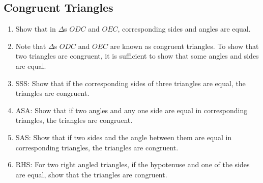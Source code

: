 \subsection{Congruent Triangles}
%
\renewcommand{\theequation}{\theenumi}
\begin{enumerate}[label=\arabic*.,ref=\thesubsection.\theenumi]

\item
	Show that in $\Delta$s $ODC$ and $OEC$, corresponding sides and angles are equal.

\item
	Note that    $\Delta$s $ODC$ and $OEC$ are known as congruent triangles.  To show that two triangles are congruent, it is sufficient to show that some angles and sides are equal.

\item
SSS:	Show that if the corresponding sides of three triangles are equal, the triangles are congruent.

\item
ASA:	Show that if two angles and any one side  are equal in corresponding triangles, the triangles are congruent.

\item
SAS:	Show that if two sides and the angle between them are equal in corresponding triangles, the triangles are congruent.

\item
RHS:	For two right angled triangles, if the hypotenuse and one of the sides are equal, show that the triangles are congruent.
\end{enumerate}

